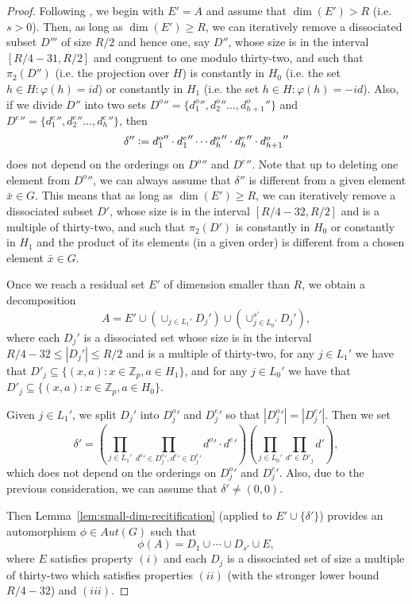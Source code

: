 \documentclass[11pt]{amsart}
\theoremstyle{definition}
\begin{document}
\begin{proof}
Following \cite{BK}, we begin with $E'=A$ and assume that $\dim(E')>R$ (i.e. $s>0$). Then, as long as $\dim(E') \geq R$, we can iteratively remove a dissociated subset $D'''$ of size $R/2$ and hence one, say $D''$, whose size is in the interval $[R/4-31, R/2]$ and congruent to one modulo thirty-two, and such that $\pi_2(D'')$ (i.e. the projection over $H$) is constantly in $H_0$ (i.e. the set $h\in H: \varphi(h)=id$) or constantly in $H_1$ (i.e. the set $h\in H: \varphi(h)=-id$). Also, if we divide $D''$ into two sets ${D^o}''=\{{d_1^o}'',{d_2^o}''\dots,{d_{h+1}^o}''\}$  and ${D^e}''=\{{d_1^e}'',{d_2^e}''\dots,{d_h^e}''\}$, then
$$\delta''\vcentcolon={d_1^o}''\cdot {d_1^e}''\cdots {d_h^o}''\cdot {d_h^e}''\cdot {d_{h+1}^o}''$$
does not depend on the orderings on ${D^o}''$ and ${D^e}''$. Note that up to deleting one element from ${D^{o}}''$, we can always assume that $\delta''$ is different from a given element $\bar{x}\in G$. This means that as long as $\dim(E') \geq R$, we can iteratively remove a dissociated subset $D'$, whose size is in the interval $[R/4-32, R/2]$ and is a multiple of thirty-two, and such that $\pi_2(D')$ is constantly in $H_0$ or constantly in $H_1$ and the product of its elements (in a given order) is different from a chosen element $\bar{x}\in G$. %

Once we reach a residual set $E'$ of dimension smaller than $R$, we obtain a decomposition $$A = E' \cup(\cup_{j\in L_1'} D_j')\cup(\cup_{j\in L_0'}^{s'} D_j'),$$
where each $D_j'$ is a dissociated set whose size is in the interval $R/4-32\leq |D_j'|\leq R/2$ and is a multiple of thirty-two, for any $j\in L_1'$ we have that $D'_j\subseteq \{(x,a): x\in \mathbb{Z}_p,a\in H_1\}$, and for any $j\in L_0'$ we have that $D'_j\subseteq \{(x,a): x\in \mathbb{Z}_p, a\in H_0\}$.

Given $j\in L_1'$, we split $D_j'$ into ${D_j^o}'$  and ${D_j^e}'$ so that $|{D_j^o}'|=|{D_j^e}'|$. Then we set
$$\delta'=\left(\prod_{j\in L_1'} \prod_{{d^o}' \in {D_j^o}', {d^e}' \in {D_j^e}'} {d^o}' \cdot {d^e}'\right) \left(\prod_{j \in L_0'}\prod_{d'\in D'_j} d'\right),$$
which does not depend on the orderings on ${D_j^o}'$ and ${D_j^e}'$.
Also, due to the previous consideration, we can assume that $\delta'\not=(0,0)$.

Then Lemma~\ref{lem:small-dim-recitification} (applied to $E' \cup \{\delta'\}$) provides an automorphism $\phi \in Aut(G)$ such that
$$\phi(A)=D_1 \cup \cdots \cup D_{s'} \cup E,$$ where $E$ satisfies property $(i)$ and each $D_j$ is a dissociated set of size a multiple of thirty-two which satisfies properties $(ii)$ (with the stronger lower bound $R/4-32$) and $(iii)$.


\end{proof}
\end{document}
